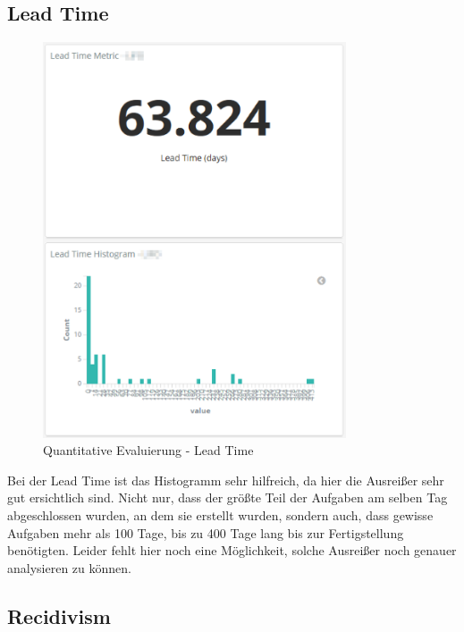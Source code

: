 \clearpage
\subsection*{Lead Time}

\begin{savenotes}
    \begin{figure}[H]
      \centering
      \includegraphics[width=0.8\textwidth]{img/eval-lead.png}
      \caption{Quantitative Evaluierung {-} Lead Time}\label{fig:eval_lead_time}
    \end{figure}
\end{savenotes}

Bei der Lead Time ist das Histogramm sehr hilfreich, da hier die Ausreißer sehr gut ersichtlich sind.
Nicht nur, dass der größte Teil der Aufgaben am selben Tag abgeschlossen wurden, an dem sie erstellt wurden, sondern auch, dass gewisse Aufgaben mehr als 100 Tage, bis zu 400 Tage lang bis zur Fertigstellung benötigten.
Leider fehlt hier noch eine Möglichkeit, solche Ausreißer noch genauer analysieren zu können.

\clearpage
\subsection*{Recidivism}

